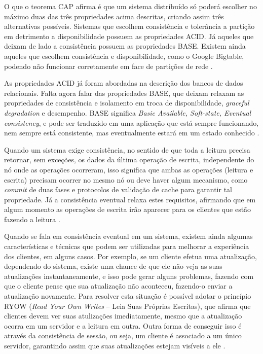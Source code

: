 \documentclass[diss]{template/setrem}
\begin{document}
O que o teorema CAP afirma é que um sistema distribuído só poderá escolher no máximo duas das três propriedades acima descritas, criando assim três alternativas possíveis. Sistemas que escolhem consistência e tolerância a partição em detrimento a disponibilidade possuem as propriedades ACID. Já aqueles que deixam de lado a consistência possuem as propriedades BASE. Existem ainda aqueles que escolhem consistência e disponibilidade, como o Google Bigtable, podendo não funcionar corretamente em face de partições de rede \citep{Strauch2011}.

As propriedades ACID já foram abordadas na descrição dos bancos de dados relacionais. Falta agora falar das propriedades BASE, que deixam relaxam as propriedades de consistência e isolamento em troca de disponibilidade, \emph{graceful degradation} e desempenho. BASE significa \emph{Basic Available, Soft-state, Eventual consistency}, e pode ser traduzido em uma aplicação que está sempre funcionando, nem sempre está consistente, mas eventualmente estará em um estado conhecido \citep{Strauch2011}.

Quando um sistema exige consistência, no sentido de que toda a leitura precisa retornar, sem exceções, os dados da última operação de escrita, independente do nó onde as operações ocorreram, isso significa que ambas as operações (leitura e escrita) precisam ocorrer no mesmo nó ou deve haver algum mecanismo, como \emph{commit} de duas fases e protocolos de validação de cache para garantir tal propriedade. Já a consistência eventual relaxa estes requisitos, afirmando que em algum momento as operações de escrita irão aparecer para os clientes que estão fazendo a leitura \citep{Strauch2011}.

Quando se fala em consistência eventual em um sistema, existem ainda algumas características e técnicas que podem ser utilizadas para melhorar a experiência dos clientes, em alguns casos. Por exemplo, se um cliente efetua uma atualização, dependendo do sistema, existe uma chance de que ele não veja as suas atualizações instantaneamente, e isso pode gerar alguns problemas, fazendo com que o cliente pense que sua atualização não aconteceu, fazendo-o enviar a atualização novamente. Para resolver esta situação é possível adotar o princípio RYOW (\emph{Read Your Own Writes} -- Leia Suas Próprias Escritas), que afirma que clientes devem ver suas atulizações imediatamente, mesmo que a atualização ocorra em um servidor e a leitura em outra. Outra forma de conseguir isso é através da consistência de sessão, ou seja, um cliente é associado a um único servidor, garantindo assim que suas atualizações estejam visíveis a ele \citep{Strauch2011}.
\end{document}
